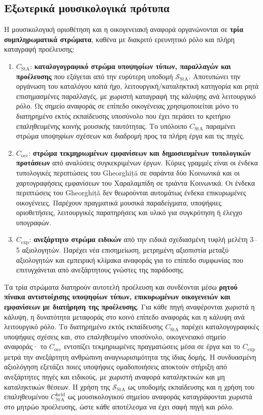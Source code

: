 \documentclass[11pt,a4paper]{article}
\begin{document}
\subsection{Εξωτερικά μουσικολογικά πρότυπα}\label{app:corpora-extrefs}

Η μουσικολογική οριοθέτηση και η οικογενειακή αναφορά οργανώνονται σε \textbf{τρία συμπληρωματικά στρώματα}, καθένα με διακριτό ερευνητικό ρόλο και πλήρη καταγραφή προέλευσης:

\begin{enumerate}
\item \(C_{\mathrm{StA}}\): \textbf{καταλογογραφικό στρώμα υποψηφίων τύπων, παραλλαγών και προέλευσης} που εξάγεται από την ευρύτερη υποδομή $\mathcal S_{\mathrm{StA}}$. Αποτυπώνει την οργάνωση του καταλόγου κατά ήχο, λειτουργική/καταληκτική κατηγορία και ρητά επισημασμένες παραλλαγές, με χωριστή καταγραφή της κάλυψης ανά λειτουργικό ρόλο. Ως σημείο αναφοράς σε επίπεδο οικογένειας χρησιμοποιείται μόνο το διατηρημένο εκτός εκπαίδευσης υποσύνολο που έχει περάσει το κριτήριο επαληθευμένης κοινής μουσικής ταυτότητας. Το υπόλοιπο $C_{\mathrm{StA}}$ παραμένει στρώμα υποψηφίων σχέσεων και διαδρομή προς τα πλήρη έργα και τις πηγές.
\item \(C_{\mathrm{occ}}\): \textbf{στρώμα τεκμηριωμένων εμφανίσεων και δημοσιευμένων τυπολογικών προτάσεων} από αναλύσεις συγκεκριμένων έργων. Κύριες γραμμές είναι οι ένδεκα τυπολογικές περιπτώσεις του Gheorghiță σε σαράντα δύο Κοινωνικά και οι χαρτογραφήσεις εμφανίσεων του Χαραλαμπίδη σε τριάντα Κοινωνικά. Οι ένδεκα περιπτώσεις του Gheorghiță δεν θεωρούνται αυτομάτως ένδεκα επικυρωμένες οικογένειες. Παρέχουν πραγματικά μουσικά παραδείγματα, υποψήφιες οριοθετήσεις, λειτουργικές παρατηρήσεις και υλικό για συγκρότηση ή έλεγχο υπογραφών.
\item \(C_{\mathrm{exp}}\): \textbf{ανεξάρτητο στρώμα ειδικών} από την ειδικά σχεδιασμένη τυφλή μελέτη 3--5 αξιολογητών. Παρέχει νέα επισημείωση, μετρημένη αξιοπιστία μεταξύ αξιολογητών και εμπειρική κλίμακα αναφοράς για το επίπεδο συμφωνίας που επιτυγχάνεται από ανεξάρτητους γνώστες της παράδοσης.
\end{enumerate}

Τα τρία στρώματα διατηρούν αυτοτελή προέλευση και συνδέονται μέσω \textbf{ρητού πίνακα αντιστοίχισης υποψηφίων τύπων, επικυρωμένων οικογενειών και εμφανίσεων με διατήρηση της προέλευσης}. Για κάθε πηγή αναφέρονται χωριστά η κάλυψη, η δυνατότητα μεταφοράς στο κοινό επίπεδο αναφοράς και η κάλυψη ανά λειτουργικό ρόλο. Το διατηρημένο εκτός εκπαίδευσης \(C_{\mathrm{StA}}\) παρέχει καταλογογραφικές υποψήφιες σχέσεις και, στο επαληθευμένο υποσύνολο, οικογενειακό σημείο αναφοράς· το \(C_{\mathrm{occ}}\) εντοπίζει τεκμηριωμένες πραγματώσεις μέσα σε έργα και το \(C_{\mathrm{exp}}\) μετρά την ανεξάρτητη ανθρώπινη αναγνωρισιμότητα της ίδιας δομής. Η συνδυασμένη αξιολόγηση εξετάζει ποιες υποψήφιες ομαδοποιήσεις αποκτούν στήριξη από ανεξάρτητες πηγές και ειδικούς, με χωριστή αναφορά καταληκτικών και μη καταληκτικών θέσεων. Η χρήση της $\mathcal S_{\mathrm{StA}}$ ως υποδομής εκπαίδευσης και η χρήση του επαληθευμένου $C_{\mathrm{StA}}^{\mathrm{held}}$ ως μουσικολογικού σημείου αναφοράς καταγράφονται χωριστά στο μητρώο προέλευσης, ώστε κάθε αποτέλεσμα να έχει σαφή πηγή και ρόλο.
\end{document}
